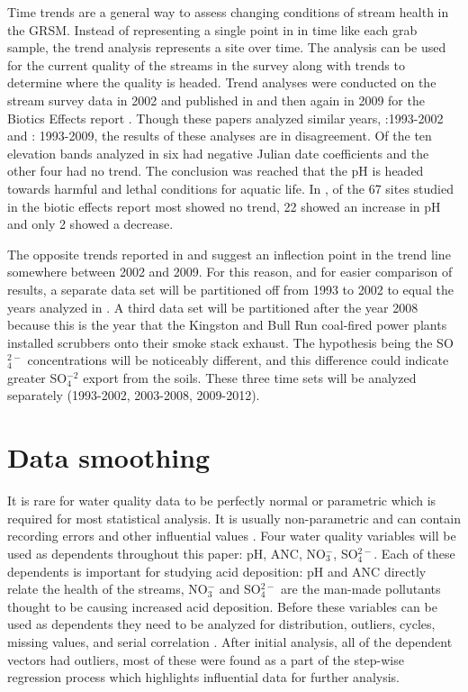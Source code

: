 Time trends are a general way to assess changing conditions of stream health in the GRSM.
Instead of representing a single point in in time like each grab sample, the trend analysis represents a site over time.
The analysis can be used for the current quality of the streams in the survey along with trends to determine where the quality is headed. %
Trend analyses were conducted on the stream survey data in 2002 and published in \citet{robinson2008ph} and then again in 2009 for the Biotics Effects report \citep{cai2013}.
Though these papers analyzed similar years, \citet{robinson2008ph}:1993-2002 and \citet{cai2013}: 1993-2009, the results of these analyses are in disagreement.
Of the ten elevation bands analyzed in \citet{robinson2008ph} six had negative Julian date coefficients and the other four had no trend.
The conclusion was reached that the pH is headed towards harmful and lethal conditions for aquatic life. 
In \citet{cai2013}, of the 67 sites studied in the biotic effects report most showed no trend, 22 showed an increase in pH and only 2 showed a decrease. 

The opposite trends reported in  \citet{robinson2008ph} and \citet{cai2013} suggest an inflection point in the trend line somewhere between 2002 and 2009. 
For this reason, and for easier comparison of results,  a separate data set will be partitioned off from 1993 to 2002 to equal the years analyzed in \citet{robinson2008ph}.  
A third data set will be partitioned after the year 2008 because this is the year that the Kingston and Bull Run coal-fired power plants installed scrubbers onto their smoke stack exhaust. 
The hypothesis being the SO$_4^{2-}$ concentrations will be noticeably different, and this difference could indicate greater SO$_4^{-2}$ export from the soils. 
These three time sets will be analyzed separately (1993-2002, 2003-2008, 2009-2012).

\section{Data smoothing}  \label{sec:smoothing}%

It is rare for water quality data to be perfectly normal or parametric which is required for most statistical analysis.
It is usually  non-parametric and can contain recording errors and other influential values \citep{helsel1992statistical}.
Four water quality variables will be used as dependents throughout this paper: pH, ANC, NO$_3^-$, SO$_4^{2-}$.
Each of these dependents is important for studying acid deposition: pH and ANC directly relate the health of the streams, NO$_3^-$ and SO$_4^{2-}$ are the man-made pollutants thought to be causing increased acid deposition.
Before these variables can be used as dependents they need to be analyzed for distribution, outliers, cycles, missing values, and serial correlation \citep{helsel1992statistical}.
After initial analysis, all of the dependent vectors had outliers, most of these were found as a part of the step-wise regression process which highlights influential data for further analysis.

